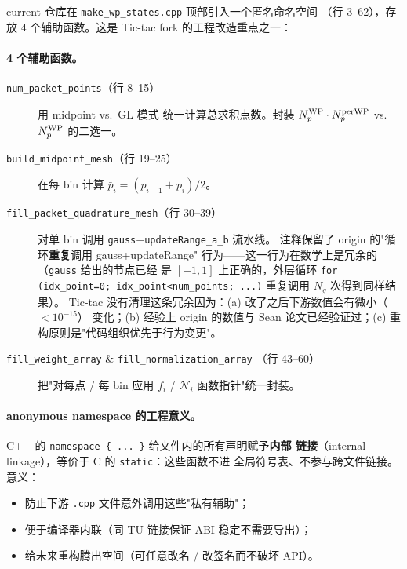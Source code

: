 current 仓库在 \texttt{make\_wp\_states.cpp} 顶部引入一个匿名命名空间
（行 3--62），存放 4 个辅助函数。这是 Tic-tac fork 的工程改造重点之一：



\paragraph{4 个辅助函数。}
\begin{description}
  \item[\texttt{num\_packet\_points}（行 8--15）] 用 midpoint vs.~GL 模式
        统一计算总求积点数。封装 \({N_{p}^{\text{WP}}} \cdot N_p^{\rm per WP}\) vs.~\({N_{p}^{\text{WP}}}\)
        的二选一。
  \item[\texttt{build\_midpoint\_mesh}（行 19--25）] 在每 bin 计算
        \(\bar{p}_i = (p_{i-1} + p_i)/2\)。
  \item[\texttt{fill\_packet\_quadrature\_mesh}（行 30--39）] 对单 bin
        调用 \texttt{gauss}\(+\)\texttt{updateRange\_a\_b} 流水线。
        注释保留了 origin 的"循环\textbf{重复}调用 gauss+updateRange"
        行为——这一行为在数学上是冗余的（\texttt{gauss} 给出的节点已经
        是 \([-1,1]\) 上正确的，外层循环
        \texttt{for (idx\_point=0; idx\_point<num\_points; ...)}
        重复调用 \(N_g\) 次得到同样结果）。
        Tic-tac 没有清理这条冗余因为：(a) 改了之后下游数值会有微小（\(<10^{-15}\)）
        变化；(b) 经验上 origin 的数值与 Sean 论文已经验证过；(c)
        重构原则是"代码组织优先于行为变更"。
  \item[\texttt{fill\_weight\_array} \& \texttt{fill\_normalization\_array}
        （行 43--60）] 把"对每点 / 每 bin 应用 \(f_i\) / \(\mathcal{N}_i\)
        函数指针"统一封装。
\end{description}

\paragraph{anonymous namespace 的工程意义。}
C++ 的 \texttt{namespace \{ ... \}} 给文件内的所有声明赋予\textbf{内部
链接}（internal linkage），等价于 C 的 \texttt{static}：这些函数不进
全局符号表、不参与跨文件链接。意义：
\begin{itemize}
  \item 防止下游 \texttt{.cpp} 文件意外调用这些"私有辅助"；
  \item 便于编译器内联（同 TU 链接保证 ABI 稳定不需要导出）；
  \item 给未来重构腾出空间（可任意改名 / 改签名而不破坏 API）。
\end{itemize}

